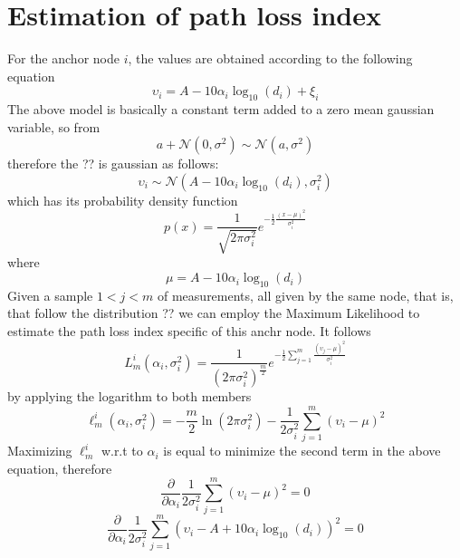 \documentclass[12pt,twoside]{report}
\begin{document}
\section{Estimation of path loss index}
For the anchor node $i$, the values are obtained according to the following equation
\begin{equation}
  \upsilon_i=A-10\alpha_i\log_{10}(d_i)+\xi_i
\end{equation}
The above model is basically a constant term added to a zero mean gaussian variable, so from \cite{alma9926534668905776}
\begin{equation}
a+\mathcal{N}(0,\sigma^2)\sim\mathcal{N}(a,\sigma^2)
\end{equation} therefore the ?? is gaussian as follows:
\begin{equation}
    \upsilon_i \sim \mathcal{N}(A-10\alpha_i\log_{10}(d_i),\sigma^2_i)
\end{equation}
which has its probability density function
\begin{equation}
    p(x)=\frac{1}{\sqrt{2\pi\sigma_i^2}}e^{-\frac{1}{2}\frac{(x-\mu)^2}{\sigma^2_i}}
\end{equation}
where
\begin{equation}
    \mu = A-10\alpha_i\log_{10}(d_i)
\end{equation}
Given a sample $1<j<m$ of measurements, all given by the same node, that is, that follow the distribution ?? we can employ the Maximum Likelihood to estimate the path loss index specific of this anchr node. It follows
\begin{equation}
    L_m^i(\alpha_i,\sigma_i^2)=
    \frac{1}{(2\pi\sigma_i^2)^{\frac{m}{2}}}e^{-\frac{1}{2}\sum_{j=1}^m\frac{(\upsilon_j-\mu)^2}{\sigma^2_i}}
\end{equation}
by applying the logarithm to both members
\begin{equation}
    \ell_m^i(\alpha_i,\sigma^2_i)=-\frac{m}{2}\ln(2\pi\sigma^2_i)-\frac{1}{2\sigma^2_i}\sum_{j=1}^m(\upsilon_i-\mu)^2
\end{equation}
Maximizing $\ell_m^i$ w.r.t to $\alpha_i$ is equal to minimize the second term in the above equation, therefore \cite{MUNOZ200923} 
\begin{equation}
\frac{\partial}{\partial \alpha_i} \frac{1}{2\sigma^2_i}\sum_{j=1}^m(\upsilon_i-\mu)^2 =0
\end{equation}
\begin{equation}
\frac{\partial}{\partial \alpha_i} \frac{1}{2\sigma^2_i}\sum_{j=1}^m(\upsilon_i-A+10\alpha_i\log_{10}(d_i))^2 =0
\end{equation}
\end{document}
